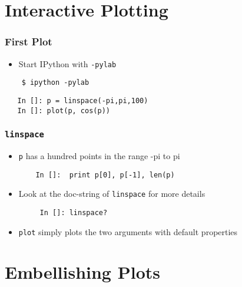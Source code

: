 \section{Interactive Plotting}

\begin{frame}[fragile]
  \frametitle{First Plot}
  \begin{itemize}
  \item Start IPython with \texttt{-pylab}
  \end{itemize}
  \begin{lstlisting}
    $ ipython -pylab
  \end{lstlisting}  %
  \begin{lstlisting}
   In []: p = linspace(-pi,pi,100) 
   In []: plot(p, cos(p))
  \end{lstlisting}
\end{frame}


\begin{frame}[fragile]
  \frametitle{\texttt{linspace}}
  \begin{itemize}
  \item \texttt{p} has a hundred points in the range -pi to pi
    \begin{lstlisting}
    In []:  print p[0], p[-1], len(p)
    \end{lstlisting}
  \item Look at the doc-string of \texttt{linspace} for more details
    \begin{lstlisting}
     In []: linspace?
    \end{lstlisting}
  \end{itemize}
  \begin{itemize}
  \item \texttt{plot} simply plots the two arguments with default
    properties 
  \end{itemize}
\end{frame}

\section{Embellishing Plots}


